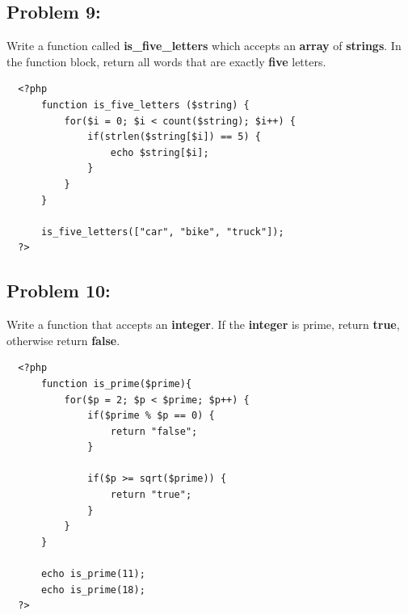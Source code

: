 \documentclass{article}
\begin{document}
\subsection*{Problem 9:}
Write a function called \textbf{is\_five\_letters} which accepts an \textbf{array} of \textbf{strings}. In the function block, return all words that are exactly \textbf{five} letters.

\begin{verbatim}
  <?php  
      function is_five_letters ($string) {
          for($i = 0; $i < count($string); $i++) {
              if(strlen($string[$i]) == 5) {
                  echo $string[$i];
              }
          }
      }

      is_five_letters(["car", "bike", "truck"]);  
  ?>
\end{verbatim}

\subsection*{Problem 10:}
Write a function that accepts an \textbf{integer}. If the \textbf{integer} is prime, return \textbf{true}, otherwise return \textbf{false}. 

\begin{verbatim}
  <?php  
      function is_prime($prime){
          for($p = 2; $p < $prime; $p++) {
              if($prime % $p == 0) {
                  return "false";
              }
          
              if($p >= sqrt($prime)) {
                  return "true";
              }
          }
      }
      
      echo is_prime(11);
      echo is_prime(18);
  ?>
\end{verbatim}
\end{document}
